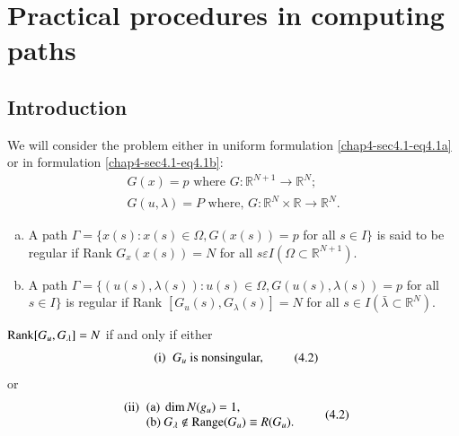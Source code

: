 \chapter{Practical procedures in computing paths}\label{chap4} %

\section{Introduction}\pageoriginale\label{chap4-sec4.1}  %

We will consider the problem either in uniform
formulation \eqref{chap4-sec4.1-eq4.1a} or in
formulation \eqref{chap4-sec4.1-eq4.1b}:   
\begin{gather*}
G(x) = p \text{ where } G: \mathbb{R}^{N+1} \to \mathbb{R}^N;
\tag{4.1a}\label{chap4-sec4.1-eq4.1a} \\
G(u, \lambda )=P \text{ where, } G:\mathbb{R}^N \times \mathbb{R} \to
\mathbb{R}^N . \tag{4.1b}\label{chap4-sec4.1-eq4.1b} 
\end{gather*}

\begin{defi*}
\begin{enumerate}[(a)]
\item A path $\Gamma = \{ x(s):x(s)\in \Omega ,G(x(s)) = p$
  for all $s \in I \}$ is said to
  be regular if Rank $G_x(x(s)) = N$ for all $s \varepsilon I(\Omega
  \subset \mathbb{R}^{N+1})$. 

\item A path $\Gamma =\{ (u(s),\lambda (s)):u(s) \in \Omega, G
  (u(s), \lambda (s)) = p$ for all $ s \in I \}$ is regular if
  Rank $[G_u(s),G_ \lambda (s)] = N$ for all $s \in I (\bar{\lambda}
  \subset \mathbb{R}^N)$. 
\end{enumerate}
\end{defi*}

\setcounter{chaplemma}{1}
\begin{chaplemma}\label{chap4-lem4.2}
$\operatorname{Rank} [G_u,G_\lambda ] = N$ if and only if either
\begin{equation*}
\begin{array}{r@{\;\;}l}
\text{\rm(i)} & G_u  \text{ is nonsingular,}\\
\end{array}\tag{4.2}\label{chap4-eq4.2}
\end{equation*}
or
\begin{equation*}
\begin{array}{r@{\;\;}l}
\text{\rm(ii)} & \text{\rm(a)}~\dim N (g_u) = 1,\\  
            & \text{\rm(b)}~G_\lambda \notin  \Range
(G_u)\equiv R(G_u). 
\end{array}\tag{4.2}\label{chap4-addeq4.2}
\end{equation*}
\end{chaplemma}

